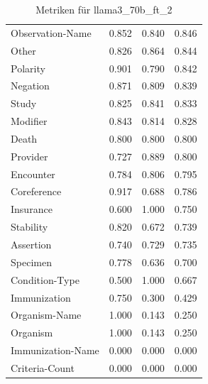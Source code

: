 \begin{table}[htbp]
\begin{tabular}{p{5cm}ccc}
Observation-Name & 0.852 & 0.840 & 0.846 \\
Other & 0.826 & 0.864 & 0.844 \\
Polarity & 0.901 & 0.790 & 0.842 \\
Negation & 0.871 & 0.809 & 0.839 \\
Study & 0.825 & 0.841 & 0.833 \\
Modifier & 0.843 & 0.814 & 0.828 \\
Death & 0.800 & 0.800 & 0.800 \\
Provider & 0.727 & 0.889 & 0.800 \\
Encounter & 0.784 & 0.806 & 0.795 \\
Coreference & 0.917 & 0.688 & 0.786 \\
Insurance & 0.600 & 1.000 & 0.750 \\
Stability & 0.820 & 0.672 & 0.739 \\
Assertion & 0.740 & 0.729 & 0.735 \\
Specimen & 0.778 & 0.636 & 0.700 \\
Condition-Type & 0.500 & 1.000 & 0.667 \\
Immunization & 0.750 & 0.300 & 0.429 \\
Organism-Name & 1.000 & 0.143 & 0.250 \\
Organism & 1.000 & 0.143 & 0.250 \\
Immunization-Name & 0.000 & 0.000 & 0.000 \\
Criteria-Count & 0.000 & 0.000 & 0.000 \\
\bottomrule
\end{tabular}
\caption{Metriken für llama3_70b_ft_2}
\label{tab:metrics_llama3_70b_ft_2}
\end{table}